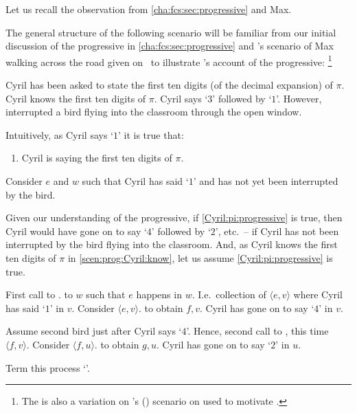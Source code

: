 \begin{note}
  Let us recall the observation from \autoref{cha:fcs:sec:progressive} and Max.

  The general structure of the following scenario will be familiar from our initial discussion of the progressive in \autoref{cha:fcs:sec:progressive} and \citeauthor{Portner:1998um}'s scenario of Max walking across the road given on~ to illustrate \citeauthor{Landman:1992wh}'s account of the progressive:%
  \footnote{
    The  is also a variation on \citeauthor{Schwarz:2020aa}'s (\citeyear{Schwarz:2020aa}) scenario on  used to motivate \AbControl{}.
  }

  \begin{scenario}[Saying \(\pi\)]
    \label{scen:prog:Cyril:know}
    Cyril has been asked to state the first ten digits (of the decimal expansion) of \(\pi\).
    Cyril knows the first ten digits of \(\pi\).
    Cyril says `\(3\)' followed by `\(1\)'.
    However, interrupted a bird flying into the classroom through the open window.
  \end{scenario}
  Intuitively, as Cyril says `\(1\)' it is true that:
  \begin{enumerate}[label=\arabic*., ref=(\arabic*), series=CyrilProg]
  \item
    \label{Cyril:pi:progressive}
    Cyril is saying the first ten digits of \(\pi\).
  \end{enumerate}

  Consider \(e\) and \(w\) such that Cyril has said `\(1\)' and has not yet been interrupted by the bird.

  Given our understanding of the progressive, if \ref{Cyril:pi:progressive} is true, then Cyril would have gone on to say `\(4\)' followed by `\(2\)', etc.\ -- if Cyril has not been interrupted by the bird flying into the classroom.
  And, as Cyril knows the first ten digits of \(\pi\) in \autoref{scen:prog:Cyril:know}, let us assume \ref{Cyril:pi:progressive} is true.

  First call to \AlgFindBranches{}.
   to \(w\) such that \(e\) happens in \(w\).
  I.e.\ collection of \(\langle e,v \rangle\) where Cyril has said `\(1\)' in \(v\).
  Consider \(\langle e,v \rangle\).
  \AlgAC{} to obtain \(f,v\).
  Cyril has gone on to say `\(4\)' in \(v\).

  Assume second bird just after Cyril says `\(4\)'.
  Hence, second call to \AlgFindBranches{}, this time \(\langle f,v \rangle\).
  Consider \(\langle f,u \rangle\).
  \AlgAC{} to obtain \(g,u\).
  Cyril has gone on to say `\(2\)' in \(u\).

  Term this process `\emph{\drift{}}'.
\end{note}

